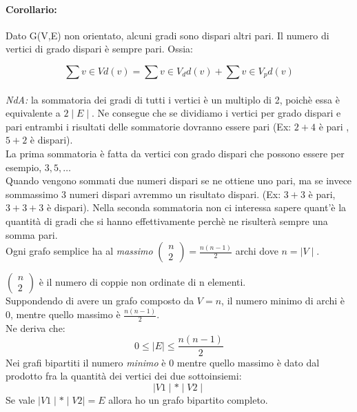     \paragraph{Corollario:} Dato G(V,E) non orientato, alcuni gradi sono dispari altri pari. Il numero di vertici di grado dispari è sempre pari. Ossia:

    \begin{equation}
    \sum{v \in V} d(v) = \sum{v \in V_d} d(v) + \sum{v \in V_p} d(v)
    \end{equation} \\

    \textit{NdA:} la sommatoria dei gradi di tutti i vertici è un multiplo di 2, poichè essa è equivalente a \( 2 \mid E \mid\). Ne consegue che se dividiamo i vertici per grado dispari e pari entrambi i risultati delle sommatorie dovranno essere pari (Ex: $2 +4$ è pari , $5+2$ è dispari). \\
    La prima sommatoria è fatta da vertici con grado dispari che possono essere per esempio, $3,5, \dots$ \\ 
    Quando vengono sommati due numeri dispari se ne ottiene uno pari, ma se invece sommassimo 3 numeri dispari avremmo un risultato dispari. (Ex: $3+3$ è pari, $3+3+3$ è dispari). Nella seconda sommatoria non ci interessa sapere quant'è la quantità di gradi che si hanno effettivamente perchè ne risulterà sempre una somma pari.\\

    Ogni grafo semplice ha al \emph{massimo} \( \left( \begin{array}{c} n \\ 2 \end{array} \right) = \frac{n(n-1)}{2} \) archi dove \( n = \mid V \mid \). \par
    \( \left( \begin{array}{c} n \\ 2 \end{array} \right) \) è il numero di coppie non ordinate di n elementi. \\
    Suppondendo di avere un grafo composto da \(V = n\), il numero minimo di archi è 0, mentre quello massimo è $\frac{n(n-1)}{2}$.\\
    Ne deriva che:
    \begin{equation}
    0 \leq \mid E \mid \leq \frac{n(n-1)}{2}
    \end{equation}
    Nei grafi bipartiti il numero \emph{minimo} è 0 mentre quello massimo è dato dal prodotto fra la quantità dei vertici dei due sottoinsiemi:
    \begin{equation}
    \mid V1 \mid * \mid V2 \mid
    \end{equation}
    Se vale \( \mid V1 \mid * \mid V2 \mid =E \) allora ho un grafo bipartito completo.

